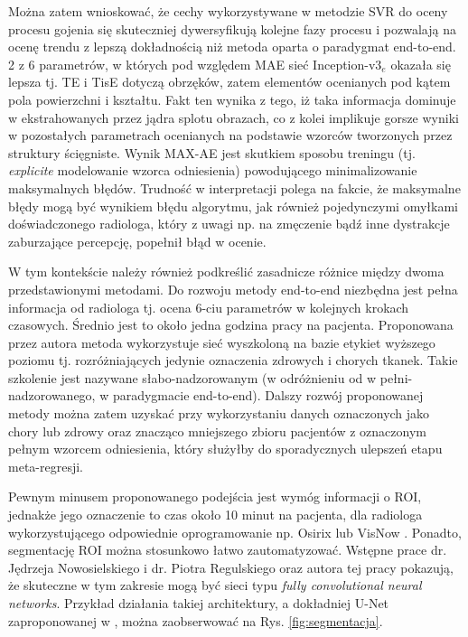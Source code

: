 Można zatem wnioskować, że cechy wykorzystywane w metodzie SVR do oceny procesu gojenia się skuteczniej dywersyfikują kolejne fazy procesu i pozwalają na ocenę trendu z lepszą dokładnością niż metoda oparta o paradygmat end-to-end. 2 z 6 parametrów, w których pod względem MAE sieć Inception-v3$_e$ okazała się lepsza tj. TE i TisE dotyczą obrzęków, zatem elementów ocenianych pod kątem pola powierzchni i kształtu. Fakt ten wynika z tego, iż taka informacja dominuje w ekstrahowanych przez jądra splotu obrazach, co z kolei implikuje gorsze wyniki w pozostałych parametrach ocenianych na podstawie wzorców tworzonych przez struktury ścięgniste. Wynik MAX-AE jest skutkiem sposobu treningu (tj. \textit{explicite} modelowanie wzorca odniesienia) powodującego minimalizowanie maksymalnych błędów. Trudność w interpretacji polega na fakcie, że maksymalne błędy mogą być wynikiem błędu algorytmu, jak również pojedynczymi omyłkami doświadczonego radiologa, który z uwagi np. na zmęczenie bądź inne dystrakcje zaburzające percepcję, popełnił błąd w ocenie.  

W tym kontekście należy również podkreślić zasadnicze różnice między dwoma przedstawionymi metodami. Do rozwoju metody end-to-end niezbędna jest pełna informacja od radiologa tj. ocena 6-ciu parametrów w kolejnych krokach czasowych. Średnio jest to około jedna godzina pracy na pacjenta. Proponowana przez autora metoda wykorzystuje sieć wyszkoloną na bazie etykiet wyższego poziomu tj. rozróżniających jedynie oznaczenia zdrowych i chorych tkanek. Takie szkolenie jest nazywane słabo-nadzorowanym (w odróżnieniu od w pełni-nadzorowanego, w paradygmacie end-to-end). Dalszy rozwój proponowanej metody można zatem uzyskać przy wykorzystaniu danych oznaczonych jako chory lub zdrowy oraz znacząco mniejszego zbioru pacjentów z oznaczonym pełnym wzorcem odniesienia, który służyłby do sporadycznych ulepszeń etapu meta-regresji. 

Pewnym minusem proponowanego podejścia jest wymóg informacji o ROI, jednakże jego oznaczenie to czas około 10 minut na pacjenta, dla radiologa wykorzystującego odpowiednie oprogramowanie np. Osirix \cite{Rosset2004} lub VisNow \cite{Nowinski_Borucki_2014}. Ponadto, segmentację ROI można stosunkowo łatwo zautomatyzować. Wstępne prace dr. Jędrzeja Nowosielskiego i dr. Piotra Regulskiego oraz autora tej pracy pokazują, że skuteczne w tym zakresie mogą być sieci typu \textit{fully convolutional neural networks}. Przykład działania takiej architektury, a dokładniej U-Net zaproponowanej w \cite{Ronneberger2015}, można zaobserwować na Rys. \ref{fig:segmentacja}. 

